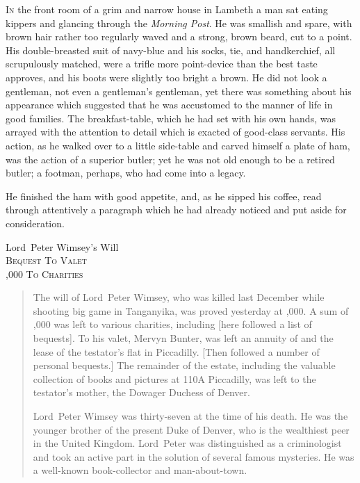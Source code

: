 
\lettrine[lines=4]{I}{n} the front room of a grim and narrow house in Lambeth a man sat eating kippers and glancing through the \textit{Morning Post}. He was smallish and spare, with brown hair rather too regularly waved and a strong, brown beard, cut to a point. His double-breasted suit of navy-blue and his socks, tie, and handkerchief, all scrupulously matched, were a trifle more point-device than the best taste approves, and his boots were slightly too bright a brown. He did not look a gentleman, not even a gentleman's gentleman, yet there was something about his appearance which suggested that he was accustomed to the manner of life in good families. The breakfast-table, which he had set with his own hands, was arrayed with the attention to detail which is exacted of good-class servants. His action, as he walked over to a little side-table and carved himself a plate of ham, was the action of a superior butler; yet he was not old enough to be a retired butler; a footman, perhaps, who had come into a legacy.

He finished the ham with good appetite, and, as he sipped his coffee, read through attentively a paragraph which he had already noticed and put aside for consideration.

\begin{center}
Lord~Peter Wimsey's Will\\
\textsc{Bequest To Valet\\
,000 To Charities}
\end{center}

\begin{quotation}
The will of Lord~Peter Wimsey, who was killed last December while shooting big game in Tanganyika, was proved yesterday at ,000. A sum of ,000 was left to various charities, including [here followed a list of bequests]. To his valet, Mervyn Bunter, was left an annuity of  and the lease of the testator's flat in Piccadilly. [Then followed a number of personal bequests.] The remainder of the estate, including the valuable collection of books and pictures at 110A Piccadilly, was left to the testator's mother, the Dowager Duchess of Denver.

Lord~Peter Wimsey was thirty-seven at the time of his death. He was the younger brother of the present Duke of Denver, who is the wealthiest peer in the United Kingdom. Lord~Peter was distinguished as a criminologist and took an active part in the solution of several famous mysteries. He was a well-known book-collector and man-about-town.
\end{quotation}

